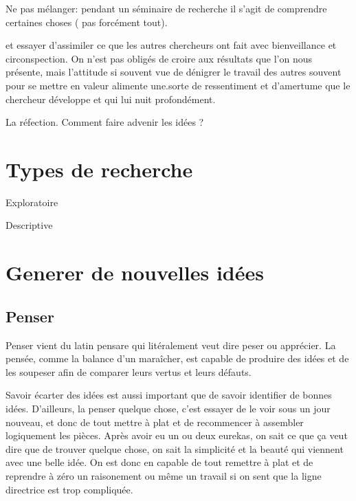 \documentclass[24pt]{article}
\begin{document}
    Ne pas mélanger: pendant un séminaire de recherche il s'agit de comprendre certaines choses ( pas forcément tout). 
     



     



        et essayer d'assimiler ce que les autres chercheurs ont fait avec bienveillance et circonspection. On n'est pas obligés de croire
        aux résultats que l'on nous présente, mais l'attitude si souvent vue de dénigrer le travail des autres souvent pour se mettre en valeur alimente une.sorte de ressentiment et d'amertume que le chercheur développe et qui lui nuit profondément.




    La réfection. Comment faire advenir les idées ?





\section{Types de recherche}
 

Exploratoire


Descriptive




\section{Generer de nouvelles idées}



 

\subsection{Penser}
Penser vient du latin pensare qui litéralement veut dire peser ou apprécier. La pensée, comme la balance d'un maraîcher, est capable de produire des idées et de les soupeser afin de comparer leurs vertus et leurs défauts.  

Savoir écarter des idées est aussi important que de savoir identifier de bonnes idées. D'ailleurs, la penser quelque chose, c'est essayer de le voir sous un jour nouveau, et donc de tout mettre à plat et  de recommencer à assembler logiquement les pièces. Après avoir eu un ou deux eurekas, on sait ce que ça veut dire que de trouver quelque chose, on sait la simplicité et la beauté qui viennent avec une belle idée. On est donc en capable de tout remettre à plat et de reprendre à zéro un raisonement ou même un travail si on sent que la ligne directrice est trop compliquée.
\end{document}
